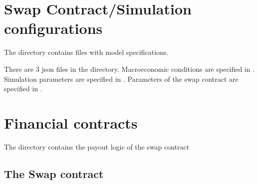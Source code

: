 \documentclass[a4paper,11pt,english]{sphinxmanual}
\begin{document}
\chapter{Swap Contract/Simulation configurations}
\label{\detokenize{contract_specs:swap-contract-simulation-configurations}}\label{\detokenize{contract_specs::doc}}
\sphinxAtStartPar
The directory  contains  files with model specifications.

\sphinxAtStartPar
There are 3 json files in the directory. 
Macroeconomic conditions are specified in . 
Simulation parameters are specified in . 
Parameters of the swap contract are specified in . 


\chapter{Financial contracts}
\label{\detokenize{financial_contracts:financial-contracts}}\label{\detokenize{financial_contracts:id1}}\label{\detokenize{financial_contracts::doc}}
\sphinxAtStartPar
The directory  contains the payout logic of the swap contract


\section{The Swap contract}
\label{\detokenize{financial_contracts:module-src.financial_contracts.swap_contract}}\label{\detokenize{financial_contracts:the-swap-contract}}
\end{document}

